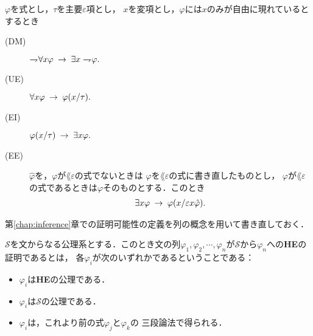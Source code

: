 	\begin{screen}
		\begin{logicalaxm}[{\bf HE}の公理(量化)]
			$\varphi$を式とし，$\tau$を主要$\varepsilon$項とし，
			$x$を変項とし，$\varphi$には$x$のみが自由に現れているとするとき
			\begin{description}
				\item[(DM)] $\rightharpoondown\hspace{-0.25em} \forall x \varphi
					\hspace{0.25em}\rightarrow\hspace{0.25em} \exists x \rightharpoondown\hspace{-0.25em} \varphi.$
				
				\item[(UE)] $\forall x \varphi \hspace{0.25em}\rightarrow\hspace{0.25em} \varphi(x/\tau).$
				
				\item[(EI)] $\varphi(x/\tau) \hspace{0.25em}\rightarrow\hspace{0.25em} \exists x \varphi.$
				
				\item[(EE)] $\hat{\varphi}$を，$\varphi$が$\lang{\varepsilon}$の式でないときは
					$\varphi$を$\lang{\varepsilon}$の式に書き直したものとし，
					$\varphi$が$\lang{\varepsilon}$の式であるときは$\varphi$そのものとする．このとき
					\begin{align}
						\exists x \varphi \hspace{0.25em}\rightarrow\hspace{0.25em} \varphi(x/\varepsilon x \hat{\varphi}).
					\end{align}
			\end{description}
		\end{logicalaxm}
	\end{screen}
	
	第\ref{chap:inference}章での証明可能性の定義を列の概念を用いて書き直しておく．
	
	\begin{screen}
		\begin{metadfn}[{\bf HE}における証明]
			$\mathscr{S}$を文からなる公理系とする．このとき文の列$\varphi_{1},\varphi_{2},\cdots,
			\varphi_{n}$が$\mathscr{S}$から$\varphi_{n}$への{\bf HE}の証明であるとは，
			各$\varphi_{i}$が次のいずれかであるということである：
			\begin{itemize}
				\item $\varphi_{i}$は{\bf HE}の公理である．
				\item $\varphi_{i}$は$\mathscr{S}$の公理である．
				\item $\varphi_{i}$は，これより前の式$\varphi_{j}$と$\varphi_{k}$の
					三段論法で得られる．
			\end{itemize}
		\end{metadfn}
	\end{screen}
	
